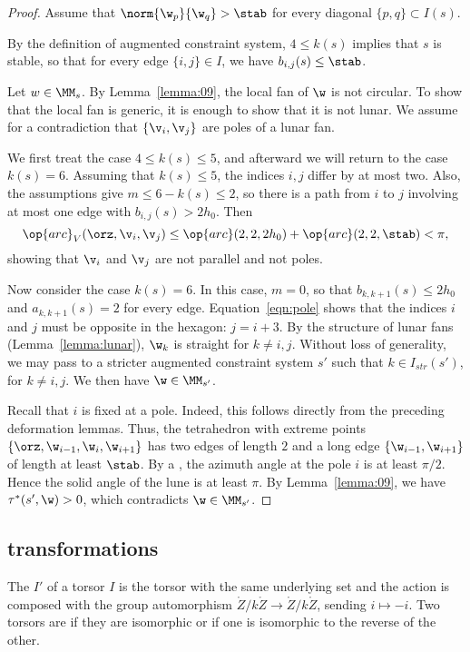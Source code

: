 \begin{proof}
Assume that $\norm{\w_p}{\w_q}> \stab$ for every diagonal $\{p,q\}\subset I(s)$.

By the definition of augmented constraint system, $4\le k(s)$ implies
that $s$ is stable, so that for every edge $\{i,j\}\in I$, we have
$b_{i,j}(s) \le\stab$.

Let $w\in \MM_s$.  By Lemma~\ref{lemma:09}, the local fan of $\w$  is not circular.
To show that the local fan is generic, it is enough to show that it is not lunar.
We assume for a contradiction that $\{\v_i,\v_j\}$ are poles of a lunar fan.

We first treat the case  $4\le k(s)\le 5$,
and afterward we will return to the case $k(s)=6$. 
Assuming that  $k(s)\le 5$, the indices $i,j$ differ by at most two.
Also, the assumptions give $m\le 6-k(s)\le 2$, so there is a path from
$i$ to $j$ involving at most one edge with $b_{i,j}(s)>2h_0$.
Then
\begin{equation}\label{eqn:pole}
\op{arc}_V(\orz,\v_i,\v_j) \le \op{arc}(2,2,2h_0) + \op{arc}(2,2,\stab) < \pi,
\end{equation}
showing that $\v_i$ and $\v_j$ are not parallel and not poles.

Now consider the case $k(s)=6$.  In this case, $m=0$, so that $b_{k,k+1}(s)\le 2h_0$
and $a_{k,k+1}(s)=2$
for every edge. Equation~\ref{eqn:pole} shows that the indices $i$ and $j$
must be opposite in the hexagon: $j = i+3$.  By the structure of lunar fans
(Lemma~\ref{lemma:lunar}), $\w_k$ is straight for $k\ne i,j$.  Without
loss of generality, we may
pass to a stricter augmented constraint system $s'$ such that
$k\in I_{str}(s')$, for $k\ne i,j$.  We then have $\w\in \MM_{s'}$.

Recall that $i$ is fixed at a pole. 
  Indeed, this follows directly from the preceding deformation
lemmas.  Thus, the tetrahedron with extreme points
$\{\orz,\w_{i-1},\w_i,\w_{i+1}\}$ has two edges
of length $2$ and a long edge $\{\w_{i-1},\w_{i+1}\}$ of length at least
$\stab$.  By a , 
the azimuth angle at the pole $i$ is at least $\pi/2$.
Hence the solid angle of the lune is at least $\pi$.  By Lemma~\ref{lemma:09},
we have $\tau^*(s',\w)>0$, which contradicts $\w\in \MM_{s'}$.
\end{proof}


\subsection{transformations}



\begin{definition} The  $I'$ of a torsor $I$ is the torsor with the
same underlying set and the action is composed with the group automorphism
$\ring{Z}/k\ring{Z}\to\ring{Z}/k\ring{Z}$, sending $i\mapsto -i$.
Two torsors are  if they are isomorphic or if 
one is isomorphic to the reverse of the other.
\end{definition}


